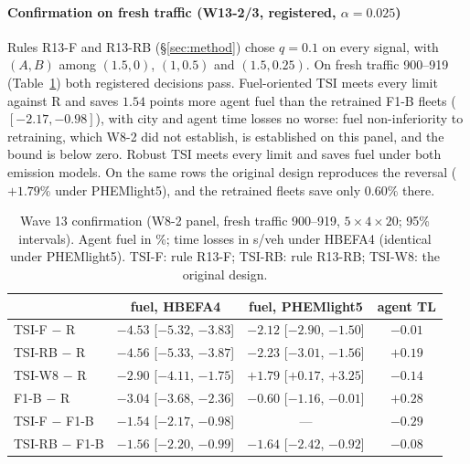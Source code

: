 \paragraph{Confirmation on fresh traffic (W13-2/3, registered, $\alpha=0.025$)} Rules R13-F and R13-RB (§\ref{sec:method}) chose $q=0.1$
on every signal, with $(A,B)$ among $(1.5,0)$, $(1,0.5)$ and $(1.5,0.25)$. On fresh traffic 900--919 (Table~\ref{tab:w13}) both
registered decisions pass. Fuel-oriented TSI meets every limit against R and saves $1.54$ points more agent fuel than the retrained F1-B fleets
($[-2.17,-0.98]$), with city and agent time losses no worse: fuel non-inferiority to retraining, which W8-2 did not establish, is established
on this panel, and the bound is below zero. Robust TSI meets every limit and saves fuel under both emission models. On the same rows the
original design reproduces the reversal ($+1.79\%$ under PHEMlight5), and the retrained fleets save only $0.60\%$ there.
\begin{table}[t]\centering\footnotesize\setlength{\tabcolsep}{4pt}
\caption{Wave 13 confirmation (W8-2 panel, fresh traffic 900--919, $5\times4\times20$; 95\% intervals). Agent fuel in \%; time losses in
s/veh under HBEFA4 (identical under PHEMlight5). TSI-F: rule R13-F; TSI-RB: rule R13-RB; TSI-W8: the original design.}\label{tab:w13}
\begin{tabular}{@{}lccc@{}}\toprule
 & fuel, HBEFA4 & fuel, PHEMlight5 & agent TL\\\midrule
TSI-F $-$ R & $-4.53$ [$-5.32$, $-3.83$] & $-2.12$ [$-2.90$, $-1.50$] & $-0.01$\\
TSI-RB $-$ R & $-4.56$ [$-5.33$, $-3.87$] & $-2.23$ [$-3.01$, $-1.56$] & $+0.19$\\
TSI-W8 $-$ R & $-2.90$ [$-4.11$, $-1.75$] & $+1.79$ [$+0.17$, $+3.25$] & $-0.14$\\
F1-B $-$ R & $-3.04$ [$-3.68$, $-2.36$] & $-0.60$ [$-1.16$, $-0.01$] & $+0.28$\\\midrule
TSI-F $-$ F1-B & $-1.54$ [$-2.17$, $-0.98$] & --- & $-0.29$\\
TSI-RB $-$ F1-B & $-1.56$ [$-2.20$, $-0.99$] & $-1.64$ [$-2.42$, $-0.92$] & $-0.08$\\\bottomrule
\end{tabular}\end{table}
